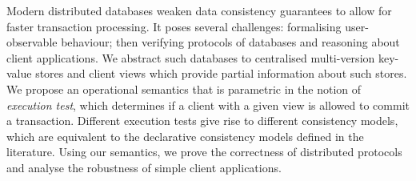 Modern distributed databases weaken  data consistency guarantees 
to allow for faster transaction processing. 
It poses several challenges: formalising user-observable behaviour;
then verifying protocols of databases and reasoning about client applications.
We abstract such databases to centralised multi-version key-value
stores
and 
client views which provide partial  information about such stores. 
We propose an operational semantics that is parametric in the notion
of {\em execution test}, 
which determines if a client with a given view is allowed to commit a
transaction. Different execution tests give rise to 
different consistency models, which are equivalent to the
declarative consistency models defined in the literature. 
Using our semantics, we prove the correctness of distributed
protocols and analyse the robustness of simple client applications. 
